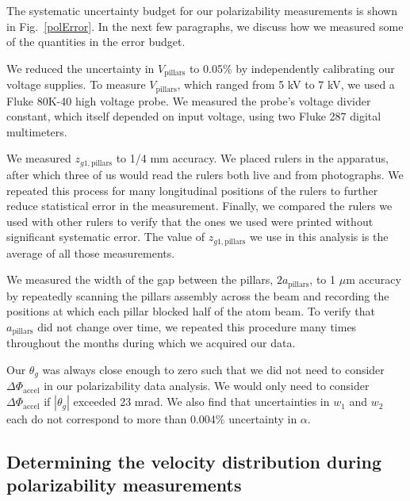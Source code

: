 \documentclass[twocolumn,pra,showpacs,superscriptaddress,longbibliography]{revtex4-1}   %
\newcommand{\figref}[1]{Fig.~\ref{#1}}
\newcommand{\dphiaccel}{\Delta\Phi_{\mathrm{accel}}}
\begin{document}
The systematic uncertainty budget for our polarizability measurements is shown in \figref{polError}. In the next few paragraphs, we discuss how we measured some of the quantities in the error budget.

We reduced the uncertainty in $V_{\mathrm{pillars}}$ to 0.05\% by independently calibrating our voltage supplies. To measure $V_{\mathrm{pillars}}$, which ranged from 5 kV to 7 kV, we used a Fluke 80K-40 high voltage probe. We measured the probe's voltage divider constant, which itself depended on input voltage, using two Fluke 287 digital multimeters.

We measured $z_{g1,\mathrm{pillars}}$ to 1/4 mm accuracy. We placed rulers in the apparatus, after which three of us  would read the rulers both live and from photographs. We repeated this process for many longitudinal positions of the rulers to further reduce statistical error in the measurement. Finally, we compared the rulers we used with other rulers to verify that the ones we used were printed without significant systematic error. The value of $z_{g1,\mathrm{pillars}}$ we use in this analysis is the average of all those measurements. 

We measured the width of the gap between the pillars, $2a_{\mathrm{pillars}}$, to 1 $\mu$m accuracy by repeatedly scanning the pillars assembly across the beam and recording the positions at which each pillar blocked half of the atom beam. 
To verify that $a_{\mathrm{pillars}}$ did not change over time, we repeated this procedure many times throughout the months during which we acquired our data.


Our $\theta_g$ was always close enough to zero such that we did not need to consider $\dphiaccel$ in our polarizability data analysis. We would only need to consider $\dphiaccel$ if $|\theta_g|$ exceeded 23 mrad.
We also find that uncertainties in $w_1$ and $w_2$ each do not correspond to more than 0.004\% uncertainty in $\alpha$.

\subsection{Determining the velocity distribution during polarizability measurements} \label{sectionDeterminingv0vr}
\end{document}
